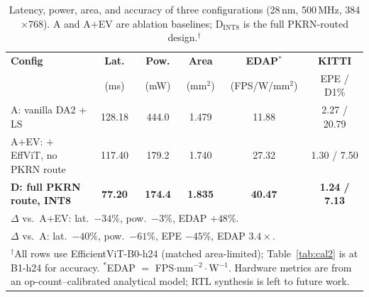 \begin{table}[t]
\caption{Latency, power, area, and accuracy of three configurations
(28\,nm, 500\,MHz, 384$\times$768). A and A$+$EV are ablation
baselines; D$_{\mathrm{INT8}}$ is the full PKRN-routed design.$^\dagger$}
\label{tab:cal1}
\centering
\setlength{\tabcolsep}{2pt}
\scriptsize
\begin{tabular}{|l|c|c|c|c|c|}
\hline
\textbf{Config} & \textbf{Lat.} & \textbf{Pow.} & \textbf{Area} & \textbf{EDAP}$^{\ast}$ & \textbf{KITTI} \\
                & (ms)          & (mW)          & (mm$^2$)      & (FPS/W/mm$^2$)          & EPE / D1\% \\
\hline
A: vanilla DA2 $+$ LS                   & 128.18 & 444.0 & 1.479 & 11.88 & 2.27 / 20.79 \\
A$+$EV: $+$ EffViT, no PKRN route       & 117.40 & 179.2 & 1.740 & 27.32 & 1.30 / 7.50  \\
\textbf{D: full PKRN route, INT8}       & \textbf{77.20} & \textbf{174.4} & \textbf{1.835} & \textbf{40.47} & \textbf{1.24 / 7.13} \\
\hline
\multicolumn{6}{|l|}{$\Delta$ vs.\ A$+$EV: lat.\ $-34\%$, pow.\ $-3\%$, EDAP $+48\%$.} \\
\multicolumn{6}{|l|}{$\Delta$ vs.\ A: lat.\ $-40\%$, pow.\ $-61\%$, EPE $-45\%$, EDAP $3.4\times$.} \\
\hline
\multicolumn{6}{|p{0.95\columnwidth}|}{$^{\dagger}$All rows use EfficientViT-B0-h24 (matched area-limited); Table~\ref{tab:cal2} is at B1-h24 for accuracy. $^{\ast}$EDAP $=$ FPS$\cdot$mm$^{-2}\cdot$W$^{-1}$. Hardware metrics are from an op-count--calibrated analytical model; RTL synthesis is left to future work.} \\
\hline
\end{tabular}
\end{table}
